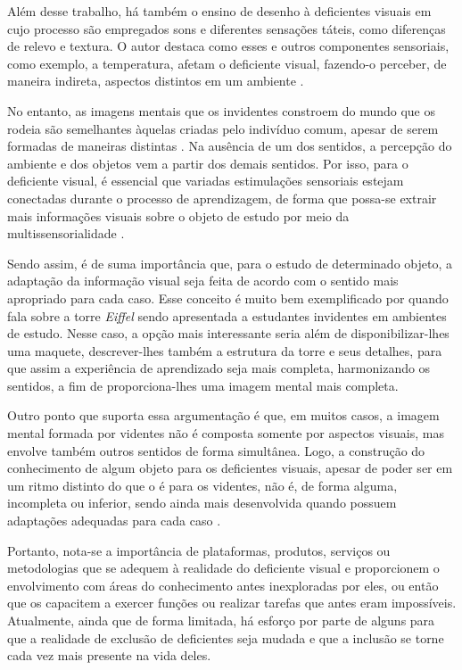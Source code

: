 Além desse trabalho, há também o ensino de desenho à deficientes visuais em cujo processo são empregados sons e diferentes sensações táteis, como diferenças de relevo e textura. O autor destaca como esses e outros componentes sensoriais, como exemplo, a temperatura, afetam o deficiente visual, fazendo-o perceber, de maneira indireta, aspectos distintos em um ambiente .

No entanto, as imagens mentais que os invidentes constroem do mundo que os rodeia são semelhantes àquelas criadas pelo indivíduo comum, apesar de serem formadas de maneiras distintas . Na ausência de um dos sentidos, a percepção do ambiente e dos objetos vem a partir dos demais sentidos. Por isso, para o deficiente visual, é essencial que variadas estimulações sensoriais estejam conectadas durante o processo de aprendizagem, de forma que possa-se extrair mais informações visuais sobre o objeto de estudo por meio da multissensorialidade .

Sendo assim, é de suma importância que, para o estudo de determinado objeto, a adaptação da informação visual seja feita de acordo com o sentido mais apropriado para cada caso. Esse conceito é muito bem exemplificado por  quando fala sobre a torre \textit{Eiffel} sendo apresentada a estudantes invidentes em ambientes de estudo. Nesse caso, a opção mais interessante seria além de disponibilizar-lhes uma maquete, descrever-lhes também a estrutura da torre e seus detalhes, para que assim a experiência de aprendizado seja mais completa, harmonizando os sentidos, a fim de proporciona-lhes uma imagem mental mais completa.

Outro ponto que suporta essa argumentação é que, em muitos casos, a imagem mental formada por videntes não é composta somente por aspectos visuais, mas envolve também outros sentidos de forma simultânea. Logo, a construção do conhecimento de algum objeto para os deficientes visuais, apesar de poder ser em um ritmo distinto do que o é para os videntes, não é, de forma alguma, incompleta ou inferior, sendo ainda mais desenvolvida quando possuem adaptações adequadas para cada caso .

Portanto, nota-se a importância de plataformas, produtos, serviços ou metodologias que se adequem à realidade do deficiente visual e proporcionem o envolvimento com áreas do conhecimento antes inexploradas por eles, ou então que os capacitem a exercer funções ou realizar tarefas que antes eram impossíveis. Atualmente, ainda que de forma limitada, há esforço por parte de alguns para que a realidade de exclusão de deficientes seja mudada e que a inclusão se torne cada vez mais presente na vida deles.

